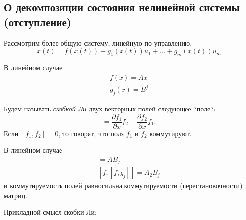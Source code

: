 \subsection{О декомпозиции состояния нелинейной системы (отступление)}
Рассмотрим более общую систему, линейную по управлению.
\begin{equation*}
	\dot{x}(t) = f(x(t)) + g_1 (x(t))u_1 + \ldots + g_m (x(t))u_m
\end{equation*}

В линейном случае
\begin{gather*}
	f(x) = Ax	\\
	g_j(x) = B^j %
\end{gather*}

\begin{df}
	Будем называть {\it скобкой Ли} двух векторных полей следующее ?поле?:
	\begin{equation*}
		[f_1(\cdot), f_2(\cdot)] = \frac {\partial f_1}{\partial x} f_2 - 
								   \frac {\partial f_2}{\partial x} f_1. 
	\end{equation*}
	Если $[f_1, f_2] = 0$, то говорят, что поля $f_1$ и $f_2$ коммутируют.

\end{df}

В линейном случае
\begin{gather*}
	[f, g_j] = AB_j \\
	[f, [f, g_j]] = A_2 B_j
\end{gather*}
и коммутируемость полей равносильна коммутируемости (перестановочности) матриц.

Прикладной смысл скобки Ли:

